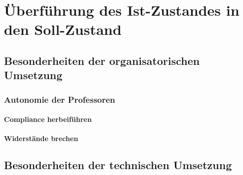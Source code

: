 \chapter{Überführung des Ist-Zustandes in den Soll-Zustand}








\section{Besonderheiten der organisatorischen Umsetzung}
\subsection{Autonomie der Professoren}
\subsubsection{Compliance herbeiführen}
\subsubsection{Widerstände brechen}

\section{Besonderheiten der technischen Umsetzung}